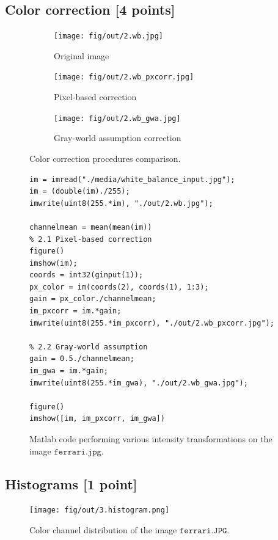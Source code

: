 \documentclass[tikz,14pt,fleqn]{article}
\begin{document}
\subsection{Color correction [4 points]}
\begin{figure}[h!]
    \begin{subfigure}{0.33\linewidth}
        \centering
        \texttt{[image: fig/out/2.wb.jpg]}
        \caption{Original image}
    \end{subfigure}
    \begin{subfigure}{0.33\linewidth}
        \centering
        \texttt{[image: fig/out/2.wb\_pxcorr.jpg]}
        \caption{Pixel-based correction}
    \end{subfigure}
    \begin{subfigure}{0.33\linewidth}
        \centering
        \texttt{[image: fig/out/2.wb\_gwa.jpg]}
        \caption{Gray-world assumption correction}
    \end{subfigure}
    \caption{Color correction procedures comparison.}
\end{figure}

\begin{figure}[h!]
    \begin{verbatim} 
im = imread("./media/white_balance_input.jpg");
im = (double(im)./255);
imwrite(uint8(255.*im), "./out/2.wb.jpg");

channelmean = mean(mean(im))
% 2.1 Pixel-based correction
figure()
imshow(im);
coords = int32(ginput(1));
px_color = im(coords(2), coords(1), 1:3);
gain = px_color./channelmean;
im_pxcorr = im.*gain;
imwrite(uint8(255.*im_pxcorr), "./out/2.wb_pxcorr.jpg");

% 2.2 Gray-world assumption
gain = 0.5./channelmean;
im_gwa = im.*gain;
imwrite(uint8(255.*im_gwa), "./out/2.wb_gwa.jpg");

figure()
imshow([im, im_pxcorr, im_gwa])
        \end{verbatim}
\caption{Matlab code performing various intensity transformations on the image $\texttt{ferrari.jpg}$.}
\end{figure}

\subsection{Histograms [1 point]}
\begin{figure}[h!]
    \centering
    \texttt{[image: fig/out/3.histogram.png]}
    \caption{Color channel distribution of the image $\texttt{ferrari.JPG}$.}
\end{figure}
\end{document}
